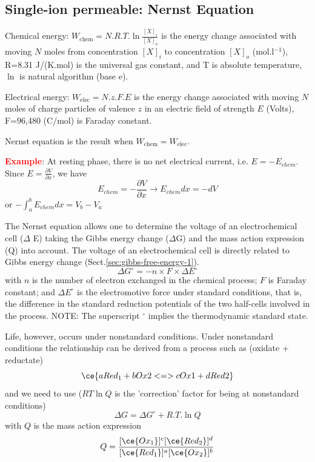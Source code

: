 \subsection{Single-ion permeable: Nernst Equation}
\label{sec:nernst-equation}

\begin{mdframed}
  
  Chemical energy: $W_\text{chem} = N.R.T.\ln \frac{[X]_i}{[X]_o}$ is the energy
  change associated with moving $N$ moles from concentration $[X]_i$ to
  concentration $[X]_o$ (mol.l$^{-1}$), R=8.31 J/(K.mol) is the universal gas
  constant, and T is absolute temperature, $\ln$ is natural algorithm (base e).
  
  Electrical energy: $W_\text{elec}=N.z.F.E$ is the energy change associated
  with moving $N$ moles of charge particles of valence $z$ in an electric field
  of strength $E$ (Volts), F=96,480 (C/mol) is Faraday constant.
  
  Nernst equation is the result when $W_\text{chem}=W_\text{elec}$.
  
\textcolor{red}{\bf Example}: %
At resting phase, there is no net electrical current, i.e. $E = - E_{chem}$.
Since $E=\frac{\partial V}{\partial x}$, we have
\begin{equation}
  \label{eq:93}
  E_{chem} = -\frac{\partial V}{\partial x} \rightarrow E_{chem}dx =
  -dV
\end{equation}
or $-\int_a^bE_{chem}dx = V_b - V_a$
   
\end{mdframed}

The Nernst equation allows one to determine the voltage of an electrochemical
cell ($\Delta$ E) taking the Gibbs energy change ($\Delta$G) and the mass action
expression (Q) into account. The voltage of an electrochemical cell is directly
related to Gibbs energy change (Sect.\ref{sec:gibbs-free-energy-1}).
\begin{equation}
\Delta G^\circ = -n \times F \times \Delta E^\circ
\end{equation}
with $n$ is the number of electron exchanged in the chemical process; $F$
is Faraday constant; and $\Delta E^\circ$ is the
electromotive force under standard conditions, that
is, the difference in the standard reduction potentials of
the two half-cells involved in the process. NOTE: The superscript $^\circ$
implies the thermodynamic standard state.

Life, however, occurs under nonstandard conditions. Under nonstandard conditions
the relationship can be derived from a process such as (oxidate + reductate)
\begin{equation}
\ce{ a Red_1 + b Ox2 <=> cOx1 + d Red2}
\end{equation}
and we need to use ($RT \ln Q$ is the 'correction' factor for being at
nonstandard conditions)
\begin{equation}
\Delta G = \Delta G^\circ + R.T.\ln Q
\end{equation}
with $Q$ is the mass action expression
\begin{equation}
Q = \frac{[\ce{Ox_1}]^c [\ce{Red_2}]^d}{[\ce{Red_1}]^a [\ce{Ox_2}]^b}
\end{equation}

